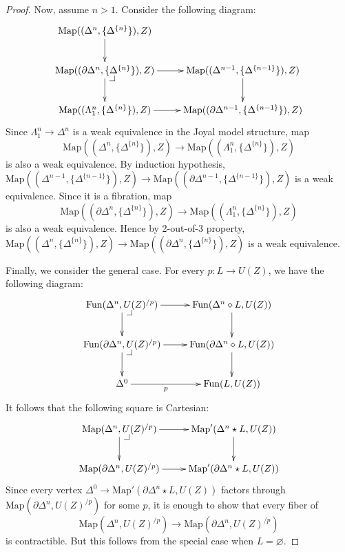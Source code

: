 \documentclass[reqno]{amsart}
\makeatletter
\theoremstyle{definition}
\theoremstyle{remark}
\newcommand{\join}{\star}
\newcommand{\fjoin}{\diamond}
\newcommand{\Map}{\mathrm{Map}}
\newcommand{\Fun}{\mathrm{Fun}}
\numberwithin{figure}{section}
\newcommand{\pb}[1][dr]{\save*!/#1-1.2pc/#1:(-1,1)@^{|-}\restore}
\makeatother
\begin{document}
\begin{proof}
Now, assume $n > 1$.
Consider the following diagram:
\[ \xymatrix{ \Map((\Delta^n, \{ \Delta^{\{n\}} \}), Z) \ar[d] \\
              \Map((\partial \Delta^n, \{ \Delta^{\{n\}} \}), Z) \ar[r] \ar[d] \pb & \Map((\Delta^{n-1}, \{ \Delta^{\{n-1\}} \}), Z) \ar[d] \\
              \Map((\Lambda^n_1, \{ \Delta^{\{n\}} \}), Z) \ar[r] & \Map((\partial \Delta^{n-1}, \{ \Delta^{\{n-1\}} \}), Z)
            } \]
Since $\Lambda^n_1 \to \Delta^n$ is a weak equivalence in the Joyal model structure, map
\[ \Map((\Delta^n, \{ \Delta^{\{n\}} \}), Z) \to \Map((\Lambda^n_1, \{ \Delta^{\{n\}} \}), Z) \]
is also a weak equivalence.
By induction hypothesis, $\Map((\Delta^{n-1}, \{ \Delta^{\{n-1\}} \}), Z) \to \Map((\partial \Delta^{n-1}, \{ \Delta^{\{n-1\}} \}), Z)$ is a weak equivalence.
Since it is a fibration, map
\[ \Map((\partial \Delta^n, \{ \Delta^{\{n\}} \}), Z) \to \Map((\Lambda^n_1, \{ \Delta^{\{n\}} \}), Z) \]
is also a weak equivalence.
Hence by 2-out-of-3 property, $\Map((\Delta^n, \{ \Delta^{\{n\}} \}), Z) \to \Map((\partial \Delta^n, \{ \Delta^{\{n\}} \}), Z)$ is a weak equivalence.

Finally, we consider the general case.
For every $p : L \to U(Z)$, we have the following diagram:
\[ \xymatrix{ \Fun(\Delta^n, U(Z)^{/p}) \ar[r] \ar[d] \pb & \Fun(\Delta^n \fjoin L, U(Z)) \ar[d] \\
              \Fun(\partial \Delta^n, U(Z)^{/p}) \ar[r] \ar[d] \pb & \Fun(\partial \Delta^n \fjoin L, U(Z)) \ar[d] \\
              \Delta^0 \ar[r]_-p & \Fun(L,U(Z))
            } \]
It follows that the following square is Cartesian:
\[ \xymatrix{ \Map(\Delta^n, U(Z)^{/p}) \ar[r] \ar[d] \pb & \Map'(\Delta^n \join L, U(Z)) \ar[d] \\
              \Map(\partial \Delta^n, U(Z)^{/p}) \ar[r] & \Map'(\partial \Delta^n \join L, U(Z))
            } \]
Since every vertex $\Delta^0 \to \Map'(\partial \Delta^n \join L, U(Z))$ factors through $\Map(\partial \Delta^n, U(Z)^{/p})$
for some $p$, it is enough to show that every fiber of \[ \Map(\Delta^n, U(Z)^{/p}) \to \Map(\partial \Delta^n, U(Z)^{/p}) \] is contractible.
But this follows from the special case when $L = \varnothing$.
\end{proof}
\end{document}
